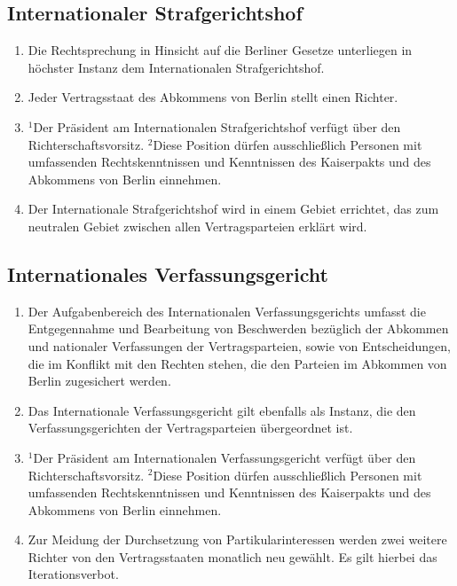 \documentclass{article}
\begin{document}
\subsection{Internationaler Strafgerichtshof}
\begin{enumerate}[(1)]
    \item Die Rechtsprechung in Hinsicht auf die Berliner Gesetze unterliegen in höchster Instanz dem Internationalen Strafgerichtshof.
    \item Jeder Vertragsstaat des Abkommens von Berlin stellt einen Richter.
    \item ${^1}$Der Präsident am Internationalen Strafgerichtshof verfügt über den Richterschaftsvorsitz. ${^2}$Diese Position dürfen ausschließlich Personen mit umfassenden Rechtskenntnissen und Kenntnissen des Kaiserpakts und des Abkommens von Berlin einnehmen.
    \item Der Internationale Strafgerichtshof wird in einem Gebiet errichtet, das zum neutralen Gebiet zwischen allen Vertragsparteien erklärt wird.
\end{enumerate}

\subsection{Internationales Verfassungsgericht}
\begin{enumerate}[(1)]
    \item Der Aufgabenbereich des Internationalen Verfassungsgerichts umfasst die Entgegennahme und Bearbeitung von Beschwerden bezüglich der Abkommen und nationaler Verfassungen der Vertragsparteien, sowie von Entscheidungen, die im Konflikt mit den Rechten stehen, die den Parteien im Abkommen von Berlin zugesichert werden.
    \item Das Internationale Verfassungsgericht gilt ebenfalls als Instanz, die den Verfassungsgerichten der Vertragsparteien übergeordnet ist.
    \item ${^1}$Der Präsident am Internationalen Verfassungsgericht verfügt über den Richterschaftsvorsitz. ${^2}$Diese Position dürfen ausschließlich Personen mit umfassenden Rechtskenntnissen und Kenntnissen des Kaiserpakts und des Abkommens von Berlin einnehmen.
    \item Zur Meidung der Durchsetzung von Partikularinteressen werden zwei weitere Richter von den Vertragsstaaten monatlich neu gewählt. Es gilt hierbei das Iterationsverbot.
\end{enumerate}
\end{document}
